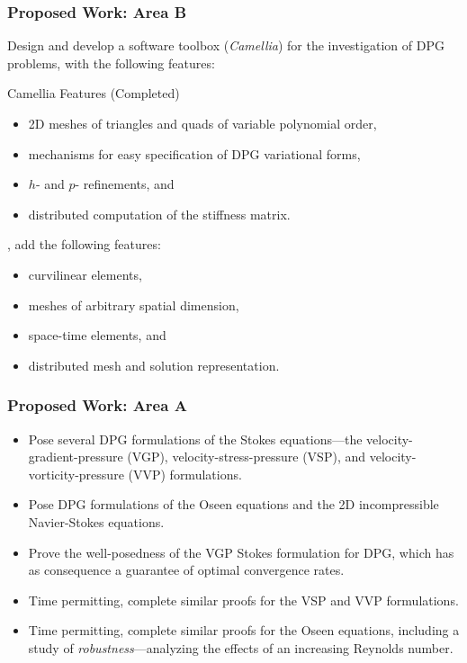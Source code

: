 \documentclass[mathserif]{beamer}
\newcommand{\pecosbold}[1]{{\color{pecos2}{#1}}}
\begin{document}
\begin{frame}
\frametitle{Proposed Work: Area B}
Design and develop a software toolbox (\emph{Camellia}) for the investigation of DPG problems, with the following features:
\begin{block}{Camellia Features (Completed)}
\begin{itemize}
\item 2D meshes of triangles and quads of variable polynomial order,
\item mechanisms for easy specification of DPG variational forms,
\item $h$- and $p$- refinements, and
\item distributed computation of the stiffness matrix.
\end{itemize}
\end{block}

\pecosbold{Time permitting}, add the following features:
\begin{block}{}
\begin{itemize}
\item curvilinear elements, 
\item meshes of arbitrary spatial dimension,
\item space-time elements, and
\item distributed mesh and solution representation.
\end{itemize}
\end{block}

\end{frame}

\begin{frame}
\frametitle{Proposed Work: Area A}

\begin{block}{}
\begin{itemize}
\item \pecosbold{Completed:} Pose several DPG formulations of the Stokes equations---the velocity-gradient-pressure (VGP), velocity-stress-pressure (VSP), and velocity-vorticity-pressure (VVP) formulations.
\item Pose DPG formulations of the Oseen equations and the 2D incompressible Navier-Stokes equations.
\item \pecosbold{Completed:} Prove the well-posedness of the VGP Stokes formulation for DPG, which has as consequence a guarantee of optimal convergence rates.
\item Time permitting, complete similar proofs for the VSP and VVP formulations.
\item Time permitting, complete similar proofs for the Oseen equations, including a study of \emph{robustness}---analyzing the effects of an increasing Reynolds number.
\end{itemize}
\end{block}

\end{frame}
\end{document}
